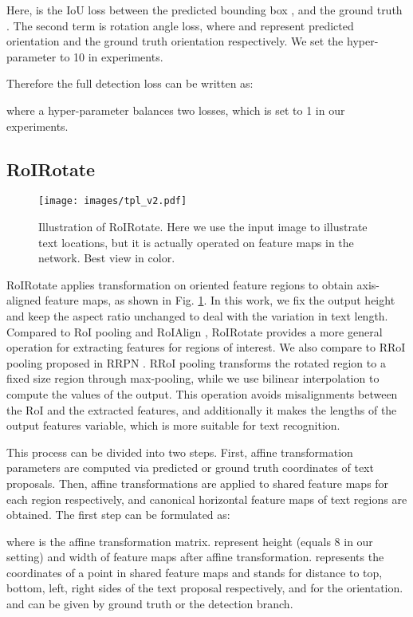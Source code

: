 \documentclass[10pt,twocolumn,letterpaper]{article}
\begin{document}
Here,  is the IoU loss between the predicted bounding box , and the ground truth . The second term is rotation angle loss, where  and  represent predicted orientation and the ground truth orientation respectively. We set the hyper-parameter  to 10 in experiments.

Therefore the full detection loss can be written as:

where a hyper-parameter  balances two losses, which is set to 1 in our experiments.

\subsection{RoIRotate}
\label{tpl}

\begin{figure}
\centering
\texttt{[image: images/tpl\_v2.pdf]}
\vspace{5pt}
\caption{Illustration of RoIRotate. Here we use the input image to illustrate text locations, but it is actually operated on feature maps in the network. Best view in color.}
\label{fig:tpl}
\end{figure}

RoIRotate applies transformation on oriented feature regions to obtain axis-aligned feature maps, as shown in Fig. \ref{fig:tpl}. In this work, we fix the output height and keep the aspect ratio unchanged to deal with the variation in text length. Compared to RoI pooling \cite{girshick2015fast} and RoIAlign \cite{he2017mask}, RoIRotate provides a more general operation for extracting features for regions of interest. We also compare to RRoI pooling proposed in RRPN \cite{ma2017rcnn}. RRoI pooling transforms the rotated region to a fixed size region through max-pooling, while we use bilinear interpolation to compute the values of the output. This operation avoids misalignments between the RoI and the extracted features, and additionally it makes the lengths of the output features variable, which is more suitable for text recognition.

This process can be divided into two steps. First, affine transformation parameters are computed via predicted or ground truth coordinates of text proposals. Then, affine transformations are applied to shared feature maps for each region respectively, and canonical horizontal feature maps of text regions are obtained. The first step can be formulated as:
{
\setlength\abovedisplayskip{0pt}
\setlength\belowdisplayskip{0pt}

}
{
\setlength\abovedisplayskip{0pt}
\setlength\belowdisplayskip{1em}

}
\newline
where  is the affine transformation matrix.  represent height (equals 8 in our setting) and width of feature maps after affine transformation.  represents the coordinates of a point in shared feature maps and  stands for distance to top, bottom, left, right sides of the text proposal respectively, and  for the orientation.  and  can be given by ground truth or the detection branch.
\end{document}
